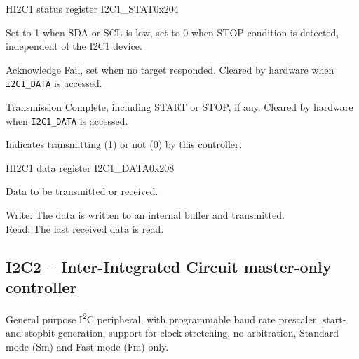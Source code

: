 \documentclass[12pt]{article}
\begin{document}
\begin{register}{H}{I2C1 status register I2C1\_STAT}{0x204}
\label{i2c1stat}
%
%
%
%
%
%
\regnewline%
\end{register}
\begin{regdesc}[0.8\textwidth]\begin{reglist}[0000000]
\item [BUSY] Set to 1 when SDA or SCL is low, set to 0 when STOP condition is detected, independent of the I2C1 device.
\item [AF] Acknowledge Fail, set when no target responded. Cleared by hardware when \lstinline|I2C1_DATA| is accessed.
\item [TC] Transmission Complete, including START or STOP, if any. Cleared by hardware when \lstinline|I2C1_DATA| is accessed.
\item [TRANS] Indicates transmitting (1) or not (0) by this controller.
\end{reglist}\end{regdesc}

\begin{register}{H}{I2C1 data register I2C1\_DATA}{0x208}
\label{i2c11data}
%
\regnewline%
\end{register}
\begin{regdesc}[0.8\textwidth]\begin{reglist}[000000000]
\item [DATA] Data to be transmitted or received.
\end{reglist}\end{regdesc}
Write: The data is written to an internal buffer and transmitted.\\
Read: The last received data is read.


\subsection{I2C2 -- Inter-Integrated Circuit master-only controller}
General purpose I\textsuperscript{2}C peripheral, with programmable baud rate prescaler, start- and stopbit generation, support for clock stretching, no arbitration, Standard mode (Sm) and Fast mode (Fm) only.
\end{document}
